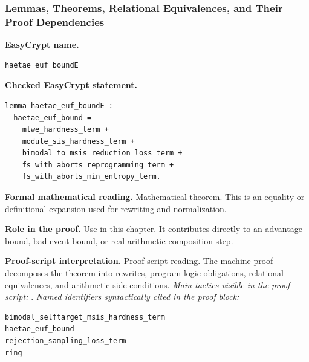 \subsubsection*{Lemmas, Theorems, Relational Equivalences, and Their Proof Dependencies}
\begin{formaltheorem}
\noindent\textbf{EasyCrypt name.}
\begin{lstlisting}[language=EasyCrypt,basicstyle=\ttfamily\scriptsize]
haetae_euf_boundE
\end{lstlisting}
\noindent\textbf{Checked EasyCrypt statement.}
\begin{lstlisting}[language=EasyCrypt,basicstyle=\ttfamily\scriptsize]
lemma haetae_euf_boundE :
  haetae_euf_bound =
    mlwe_hardness_term +
    module_sis_hardness_term +
    bimodal_to_msis_reduction_loss_term +
    fs_with_aborts_reprogramming_term +
    fs_with_aborts_min_entropy_term.
\end{lstlisting}
\noindent\textbf{Formal mathematical reading.}
Mathematical theorem. This is an equality or definitional expansion used for rewriting and normalization.

\noindent\textbf{Role in the proof.}
Use in this chapter. It contributes directly to an advantage bound, bad-event bound, or real-arithmetic composition step.

\noindent\textbf{Proof-script interpretation.}
Proof-script reading. The machine proof decomposes the theorem into rewrites, program-logic obligations, relational equivalences, and arithmetic side conditions.
\emph{Main tactics visible in the proof script:} .
\emph{Named identifiers syntactically cited in the proof block:}
\begin{lstlisting}[language=EasyCrypt,basicstyle=\ttfamily\scriptsize]
bimodal_selftarget_msis_hardness_term
haetae_euf_bound
rejection_sampling_loss_term
ring
\end{lstlisting}

\end{formaltheorem}

